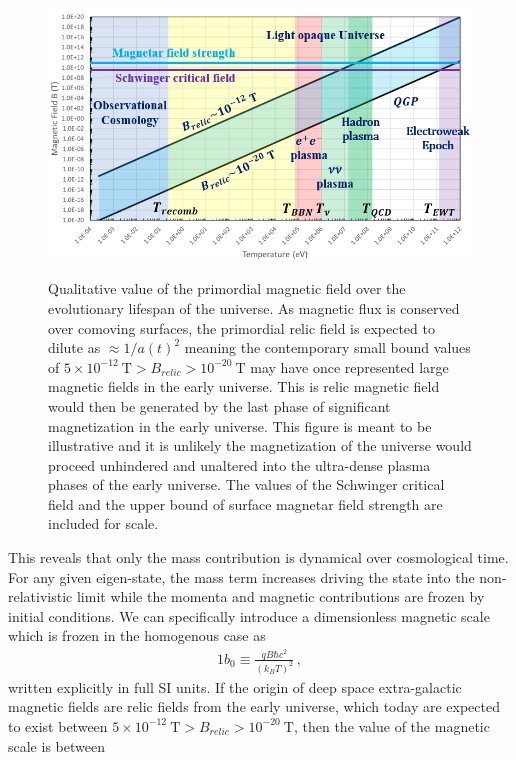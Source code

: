 \documentclass[
aps,
pra,
showpacs,
preprintnumbers,
amsmath,
amssymb,
footinbib
]{revtex4-2}
\begin{document}
\begin{figure}[t]
    \includegraphics[scale=0.75]{relic_plot.PNG}
    \label{fig1}
    \caption{Qualitative value of the primordial magnetic field over the evolutionary lifespan of the universe. As magnetic flux is conserved over comoving surfaces, the primordial relic field is expected to dilute as $\approx1/a(t)^{2}$ meaning the contemporary small bound values of $5\times10^{-12}\ \mathrm{T}>B_{relic}>10^{-20}\ \mathrm{T}$ may have once represented large magnetic fields in the early universe. This is relic magnetic field would then be generated by the last phase of significant magnetization in the early universe. This figure is meant to be illustrative and it is unlikely the magnetization of the universe would proceed unhindered and unaltered into the ultra-dense plasma phases of the early universe. The values of the Schwinger critical field and the upper bound of surface magnetar field strength are included for scale.}
    \centering
\end{figure}
This reveals that only the mass contribution is dynamical over cosmological time. For any given eigen-state, the mass term increases driving the state into the non-relativistic limit while the momenta and magnetic contributions are frozen by initial conditions. We can specifically introduce a dimensionless magnetic scale which is frozen in the homogenous case as
\begin{alignat}{1}
    \label{Bo} b_{0}\equiv\frac{qB\hbar c^{2}}{(k_{B}T)^{2}}\,,
\end{alignat}
written explicitly in full SI units. If the origin of deep space extra-galactic magnetic fields are relic fields from the early universe, which today are expected to exist between $5\times10^{-12}\ \mathrm{T}>B_{relic}>10^{-20}\ \mathrm{T}$, then the value of the magnetic scale is between
\end{document}
